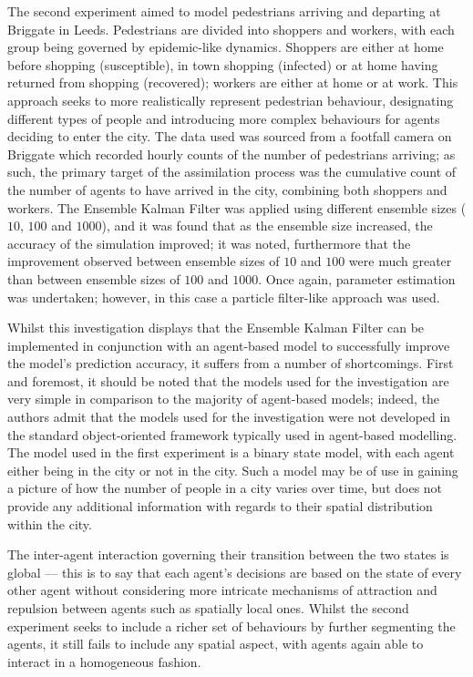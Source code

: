 The second experiment aimed to model pedestrians arriving and departing at
Briggate in Leeds.
Pedestrians are divided into shoppers and workers, with each group being
governed by epidemic-like dynamics.
Shoppers are either at home before shopping (susceptible), in town shopping
(infected) or at home having returned from shopping (recovered); workers are
either at home or at work.
This approach seeks to more realistically represent pedestrian behaviour,
designating different types of people and introducing more complex behaviours
for agents deciding to enter the city.
The data used was sourced from a footfall camera on Briggate which recorded
hourly counts of the number of pedestrians arriving; as such, the primary target
of the assimilation process was the cumulative count of the number of agents to
have arrived in the city, combining both shoppers and workers.
The Ensemble Kalman Filter was applied using different ensemble sizes ($10$,
$100$ and $1000$), and it was found that as the ensemble size increased, the
accuracy of the simulation improved; it was noted, furthermore that the
improvement observed between ensemble sizes of $10$ and $100$ were much greater
than between ensemble sizes of $100$ and $1000$.
Once again, parameter estimation was undertaken; however, in this case a
particle filter-like approach was used.

Whilst this investigation displays that the Ensemble Kalman Filter can be
implemented in conjunction with an agent-based model to successfully improve the
model's prediction accuracy, it suffers from a number of shortcomings.
First and foremost, it should be noted that the models used for the
investigation are very simple in comparison to the majority of agent-based
models; indeed, the authors admit that the models used for the investigation
were not developed in the standard object-oriented framework typically used in
agent-based modelling.
The model used in the first experiment is a binary state model, with each agent
either being in the city or not in the city.
Such a model may be of use in gaining a picture of how the number of people in a
city varies over time, but does not provide any additional information with
regards to their spatial distribution within the city.

The inter-agent interaction governing their transition between the two states is
global --- this is to say that each agent's decisions are based on the state of
every other agent without considering more intricate mechanisms of attraction
and repulsion between agents \citep{helbing1995social} such as spatially local
ones.
Whilst the second experiment seeks to include a richer set of behaviours by
further segmenting the agents, it still fails to include any spatial aspect,
with agents again able to interact in a homogeneous fashion.

